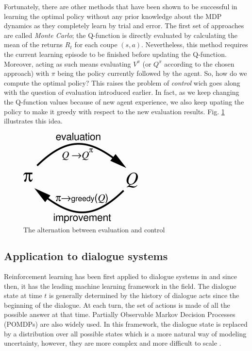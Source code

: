         Fortunately, there are other methods that have been shown to be successful in learning the optimal policy without any prior knowledge about the MDP dynamics as they completely learn by trial and error. The first set of approaches are called \textit{Monte Carlo}; the Q-function is directly evaluated by calculating the mean of the returns $R_t$ for each coupe $(s,a)$. Nevertheless, this method requires the current learning episode to be finished before updating the Q-function. Moreover, acting as such means evaluating $V^{\pi}$ (or $Q^{\pi}$ according to the chosen approach) with $\pi$ being the policy currently followed by the agent. So, how do we compute the optimal policy? This raises the problem of \textit{control} wich goes along with the question of evaluation introduced earlier. In fact, as we keep changing the Q-function values because of new agent experience, we also keep upating the policy to make it greedy with respect to the new evaluation results. Fig. \ref{fig:evalctrl} illustrates this idea.

        \begin{figure}
          \centering
          \includegraphics[scale=0.7]{figures/evalctrl.png}
          \caption{The alternation between evaluation and control}
          \label{fig:evalctrl}
        \end{figure}

        
    \subsection{Application to dialogue systems}
    
    	Reinforcement learning has been first applied to dialogue systems in \cite{Levin1997} and since then, it has the leading machine learning framework in the field. The dialogue state at time $t$ is generally determined by the history of dialogue acts since the beginning of the dialogue. At each turn, the set of actions is made of all the possible answer at that time. Partially Observable Markov Decision Processes (POMDPs) are also widely used. In this framework, the dialogue state is replaced by a distribution over all possible states which is a more natural way of modeling uncertainty, however, they are more complex and more difficult to scale \cite{Lemon2007}.
        
